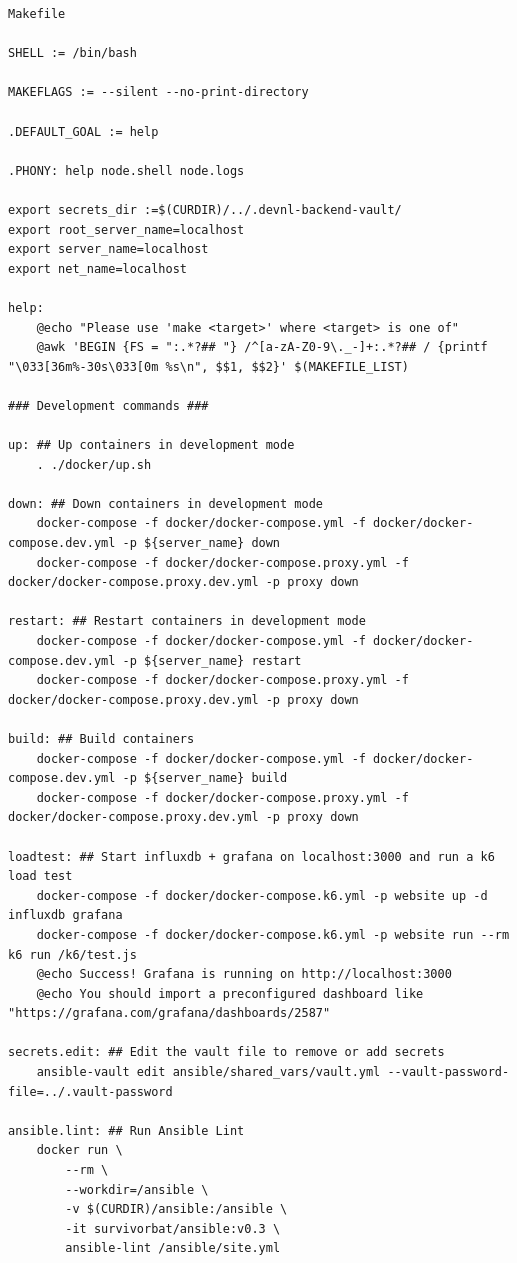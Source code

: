 \begin{verbatim}
Makefile

SHELL := /bin/bash

MAKEFLAGS := --silent --no-print-directory

.DEFAULT_GOAL := help

.PHONY: help node.shell node.logs

export secrets_dir :=$(CURDIR)/../.devnl-backend-vault/
export root_server_name=localhost
export server_name=localhost
export net_name=localhost

help:
	@echo "Please use 'make <target>' where <target> is one of"
	@awk 'BEGIN {FS = ":.*?## "} /^[a-zA-Z0-9\._-]+:.*?## / {printf "\033[36m%-30s\033[0m %s\n", $$1, $$2}' $(MAKEFILE_LIST)

### Development commands ###

up: ## Up containers in development mode
	. ./docker/up.sh

down: ## Down containers in development mode
	docker-compose -f docker/docker-compose.yml -f docker/docker-compose.dev.yml -p ${server_name} down
	docker-compose -f docker/docker-compose.proxy.yml -f docker/docker-compose.proxy.dev.yml -p proxy down

restart: ## Restart containers in development mode
	docker-compose -f docker/docker-compose.yml -f docker/docker-compose.dev.yml -p ${server_name} restart
	docker-compose -f docker/docker-compose.proxy.yml -f docker/docker-compose.proxy.dev.yml -p proxy down

build: ## Build containers
	docker-compose -f docker/docker-compose.yml -f docker/docker-compose.dev.yml -p ${server_name} build
	docker-compose -f docker/docker-compose.proxy.yml -f docker/docker-compose.proxy.dev.yml -p proxy down

loadtest: ## Start influxdb + grafana on localhost:3000 and run a k6 load test
	docker-compose -f docker/docker-compose.k6.yml -p website up -d influxdb grafana
	docker-compose -f docker/docker-compose.k6.yml -p website run --rm k6 run /k6/test.js
	@echo Success! Grafana is running on http://localhost:3000
	@echo You should import a preconfigured dashboard like "https://grafana.com/grafana/dashboards/2587"

secrets.edit: ## Edit the vault file to remove or add secrets
	ansible-vault edit ansible/shared_vars/vault.yml --vault-password-file=../.vault-password

ansible.lint: ## Run Ansible Lint
	docker run \
		--rm \
		--workdir=/ansible \
		-v $(CURDIR)/ansible:/ansible \
		-it survivorbat/ansible:v0.3 \
		ansible-lint /ansible/site.yml


\end{verbatim}
